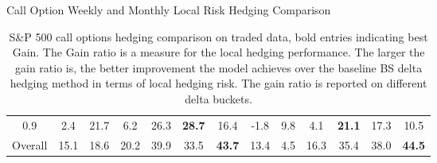 \documentclass[10pt,table,mathserif]{beamer}
\begin{document}
\begin{frame}{Call Option Weekly and Monthly Local Risk Hedging Comparison}
\begin{table}[htp!]
{\begin{threeparttable}
\begin{tabular}{|c|cccccc| cccccc|}
			0.9 &2.4  &21.7   &6.2      &26.3 &\textbf{28.7}&16.4     &-1.8  &9.8    &4.1  &\textbf{21.1}       & 17.3& 10.5  \\
			
			Overall&15.1&18.6 &20.2     &39.9 &33.5  &\textbf{43.7}    &13.4  & 4.5   &16.3 &35.4     &38.0    & \textbf{44.5}  \\
			\hline
		\end{tabular}
		\caption{S\&P 500 call options hedging comparison on traded data, bold entries indicating best Gain.  The Gain ratio is a measure for the local hedging performance. The larger the gain ratio is, the better improvement the model achieves over the baseline BS delta hedging method in terms of local hedging risk. The gain ratio is reported on different delta buckets.  }
\label{SP500CallC}
\end{threeparttable}
}
\end{table}
\end{frame}
\end{document}
